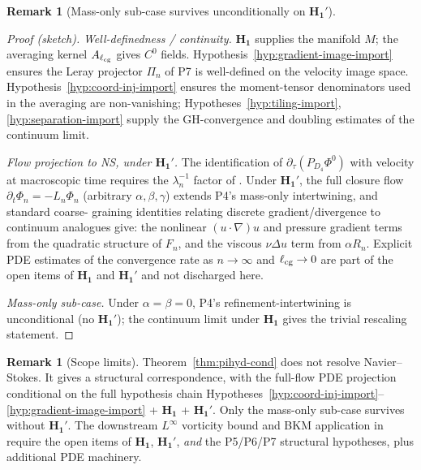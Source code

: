 \documentclass[11pt, a4paper]{amsart}
\theoremstyle{definition}
\newtheorem{remark}[theorem]{Remark}
\begin{document}
\begin{remark}[Mass-only sub-case survives unconditionally on $\mathbf{H_1'}$]
\begin{proof}[Proof (sketch)]
\emph{Well-definedness / continuity.} $\mathbf{H_1}$ supplies the
manifold $M$; the averaging kernel $A_{\ell_{\rm cg}}$ gives $C^0$
fields. Hypothesis~\ref{hyp:gradient-image-import} ensures the
Leray projector $\Pi_n$ of P7 is well-defined on the velocity
image space. Hypothesis~\ref{hyp:coord-inj-import} ensures the
moment-tensor denominators used in the averaging are non-vanishing;
Hypotheses~\ref{hyp:tiling-import}, \ref{hyp:separation-import}
supply the GH-convergence and doubling estimates of the continuum
limit.

\emph{Flow projection to NS, under $\mathbf{H_1'}$.} The
identification of $\partial_\tau(P_{D_4}\Phi^0)$ with velocity at
macroscopic time requires the $\lambda_n^{-1}$ factor of
\cite[Thm.~thm:projected-dynamics, $D_n^{\rm comm}$]{CascadeHydroProjection}.
Under $\mathbf{H_1'}$, the full closure flow
$\partial_t \Phi_n = -L_n \Phi_n$ (arbitrary $\alpha, \beta,
\gamma$) extends P4's mass-only intertwining, and standard coarse-
graining identities relating discrete gradient/divergence to
continuum analogues give: the nonlinear $(u \cdot \nabla)u$ and
pressure gradient terms from the quadratic structure of $F_n$, and
the viscous $\nu\Delta u$ term from $\alpha R_n$. Explicit PDE
estimates of the convergence rate as $n\to\infty$ and
$\ell_{\rm cg}\to 0$ are part of the open items of $\mathbf{H_1}$
and $\mathbf{H_1'}$ and not discharged here.

\emph{Mass-only sub-case.} Under $\alpha = \beta = 0$, P4's
refinement-intertwining is unconditional (no $\mathbf{H_1'}$); the
continuum limit under $\mathbf{H_1}$ gives the trivial rescaling
statement.
\end{proof}

\begin{remark}[Scope limits]
Theorem~\ref{thm:pihyd-cond} does not resolve Navier--Stokes. It
gives a structural correspondence, with the full-flow PDE
projection conditional on the full hypothesis chain
Hypotheses~\ref{hyp:coord-inj-import}--\ref{hyp:gradient-image-import}
+ $\mathbf{H_1}$ + $\mathbf{H_1'}$. Only the mass-only sub-case
survives without $\mathbf{H_1'}$. The downstream $L^\infty$
vorticity bound and BKM application in \cite{MillenniumNS} require
the open items of $\mathbf{H_1}$, $\mathbf{H_1'}$, \emph{and} the
P5/P6/P7 structural hypotheses, plus additional PDE machinery.
\end{remark}


\end{remark}
\end{document}
